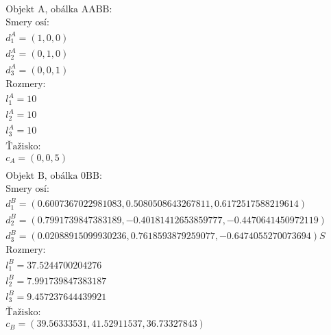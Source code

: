 \documentclass[a4paper]{article}
\begin{document}
	\begin{align*}
		&\text{Objekt A, obálka AABB:}
		\\
		&\text{Smery osí:}
		\\
		&d_1^A = (1, 0, 0) 
		\\
		&d_2^A = (0, 1, 0) 
		\\
		&d_3^A = (0, 0, 1)
		\\
		&\text{Rozmery:}
		\\
		&l_1^A = 10
		\\
		&l_2^A = 10
		\\
		&l_3^A =10
		\\
		&\text{Ťažisko:}
		\\
		&c_A = (0, 0, 5) 
		\\
		\\
		&\text{Objekt B, obálka 0BB:}
		\\
		&\text{Smery osí:}
		\\
		&d_1^B = (0.6007367022981083, 0.5080508643267811, 0.6172517588219614)
		\\
		&d_2^B = (0.7991739847383189, -0.40181412653859777, -0.4470641450972119)
		\\
		&d_3^B = (0.02088915099930236, 0.7618593879259077, -0.6474055270073694) S
		\\
		&\text{Rozmery:}
		\\
		&l_1^B = 37.5244700204276
		\\
		&l_2^B = 7.991739847383187
		\\
		&l_3^B = 9.457237644439921
		\\
		&\text{Ťažisko:}
		\\
		&c_B = (39.56333531, 41.52911537, 36.73327843)
	\end{align*}
	\newpage
\end{document}
